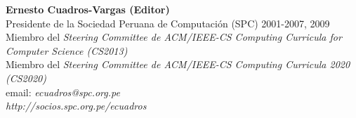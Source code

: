 \noindent \textbf{Ernesto Cuadros-Vargas (Editor)}\\ 
Presidente de la Sociedad Peruana de Computación (SPC) 2001-2007, 2009\\
Miembro del {\it Steering Committee de ACM/IEEE-CS Computing Curricula for Computer Science (CS2013)}\\
Miembro del \textit{Steering Committee de ACM/IEEE-CS Computing Curricula 2020 (CS2020)}\\
email: \textit{ecuadros@spc.org.pe}\\
\textit{http://socios.spc.org.pe/ecuadros}
